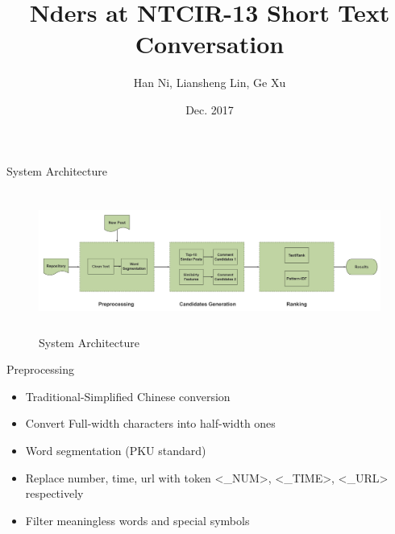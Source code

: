 \documentclass[aspectratio=169]{beamer}
\title{Nders at NTCIR-13 Short Text Conversation }
\author{Han Ni, Liansheng Lin, Ge Xu}
\institute{NetDragon Websoft Inc.}
\date{Dec. 2017}
\begin{document}
  \maketitle


    \begin{frame}{System Architecture}
      \begin{figure}
      \includegraphics[width=14cm,height=4.63cm]{stc-flow-big.png}
      \caption{System Architecture}
      \end{figure}
    \end{frame}

    \begin{frame}{Preprocessing}
      \begin{itemize}
        \item Traditional-Simplified Chinese conversion
        \item Convert Full-width characters into half-width ones
        \item Word segmentation (PKU standard)
        \item Replace number, time, url with token <\_NUM>, <\_TIME>, <\_URL> respectively
        \item Filter meaningless words and special symbols
      \end{itemize}
    \end{frame}

    {
    
    }

    
\end{document}
